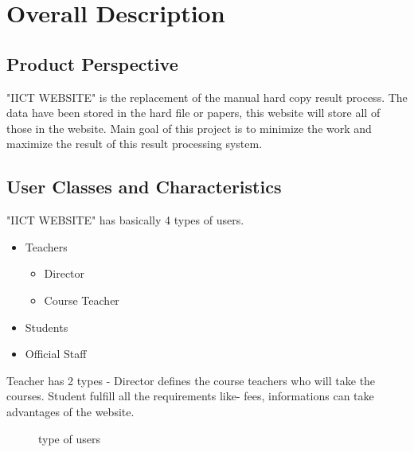 \documentclass{scrreprt}
\begin{document}
\chapter{Overall Description}

\section{Product Perspective}
"IICT WEBSITE" is the replacement of the manual hard copy result process. The data have been stored in the hard file or papers, this website will store all of those in the website. Main goal of this project is to minimize the work and maximize the result of this result processing system.

\section{User Classes and Characteristics}
"IICT WEBSITE" has basically 4 types of users. 
\begin{itemize}
  \item Teachers
    \begin{itemize}
        \item Director
        \item Course Teacher
    \end{itemize}
  \item Students
  \item Official Staff
\end{itemize}
Teacher has 2 types - Director defines the course teachers who will take the courses. Student fulfill all the requirements like- fees, informations can take advantages of the website. 
\begin{figure}
    \centering
    \caption{type of users}
    \label{fig:type of users}
\end{figure}
\end{document}

